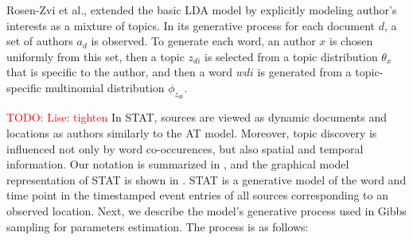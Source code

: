 \documentclass[conference]{IEEEtran}
\newcommand{\model}{{STAT}\xspace} %
\newcommand{\todo}[1]{\textcolor{red}{{TODO: #1}}}
\begin{document}
Rosen-Zvi et al., extended the basic LDA model by explicitly modeling author's interests as a mixture of topics. In its generative process for each document $d$, a set of authors $a_d$ is observed. To generate each word, an author $x$ is chosen uniformly from this set, then a topic $z_{di}$ is selected from a topic distribution $\theta_{x}$ that is specific to the author, and then a word  $w{di}$ is generated from a topic-specific multinomial distribution $\phi_{z_{di}}$.

\todo{Lise: tighten} In \model, sources are viewed as dynamic documents and locations as authors similarly to the AT model. Moreover, topic discovery is influenced not only by word co-occurences, but also spatial and temporal information. Our notation is summarized in , and the graphical model representation of \model is shown in .  \model is a generative model of the word and time point in the timestamped event entries of all sources corresponding to an observed location. Next, we describe the model's generative process used in Gibbs sampling for parameters estimation. The process is as follows: 
\end{document}
